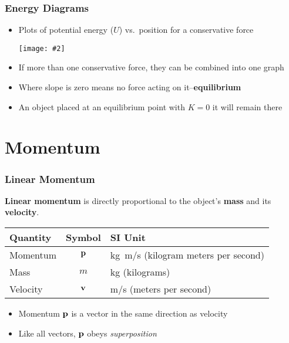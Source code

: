 \documentclass[12pt,compress,aspectratio=169]{beamer}
\newcommand{\pic}[2]{\texttt{[image: \#2]}}
\newcommand{\mb}[1]{\ensuremath\mathbf{#1}}
\begin{document}
\begin{frame}
  \frametitle{Energy Diagrams}
  \begin{itemize}
  \item Plots of potential energy ($U$) vs.\ position for a conservative force
    \begin{center}
      \pic{0.5}{energy-diagram.png}
    \end{center}
  \item If more than one conservative force, they can be combined into one graph
  \item Where slope is zero means no force acting on it--\textbf{equilibrium}
  \item An object placed at an equilibrium point with $K=0$ it will remain there
  \end{itemize}
\end{frame}

\section{Momentum}


\begin{frame}
  \frametitle{Linear Momentum}
  \textbf{Linear momentum} is directly proportional to the object's
  \textbf{mass} and its \textbf{velocity}.

  \vspace{-0.35in}{\Huge
    \begin{displaymath}
      \boxed{\mb{p}=m\mb{v}}
    \end{displaymath}
  }
  \begin{center}
    \begin{tabular}{l|c|l}
      \rowcolor{pink}
      \textbf{Quantity} & \textbf{Symbol} & \textbf{SI Unit} \\ \hline
      Momentum & $\mb{p}$ & \si{kg.m/s} (kilogram meters per second) \\
      Mass      & $m$    & \si{kg} (kilograms) \\
      Velocity  & $\mb{v}$ & \si{m/s} (meters per second) \\
    \end{tabular}
  \end{center}
  \begin{itemize}
  \item Momentum $\mb{p}$ is a vector in the same direction as velocity
  \item Like all vectors, $\mb{p}$ obeys \emph{superposition}
  \end{itemize}
\end{frame}
\end{document}

